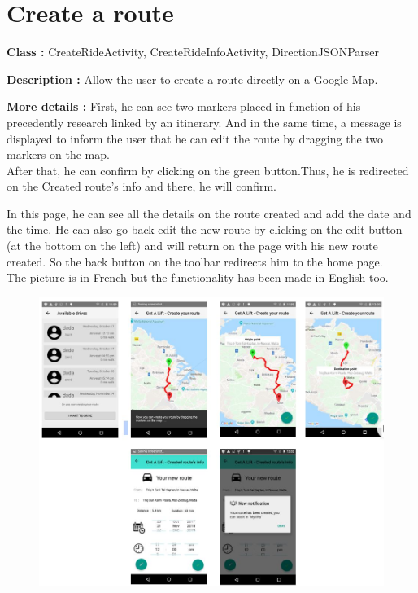 \section{Create a route}
\textbf{Class :} CreateRideActivity, CreateRideInfoActivity, DirectionJSONParser \newline

\textbf{Description :} Allow the user to create a route directly on a Google Map. \newline

\textbf{More details : }First, he can see two markers placed in function of his precedently research linked by an itinerary. And in the same time, a message is displayed to inform the user that he can edit the route by dragging the two markers on the map.\\ After that, he can confirm by clicking on the green button.Thus, he is redirected on the Created route’s info and there, he will confirm. \newline

In this page, he can see all the details on the route created and add the date and the time. He can also go back edit the new route by clicking on the edit button (at the bottom on the left) and will return on the page with his new route created.
So the back button on the toolbar redirects him to the home page. \\ 
The picture is in French but the functionality has been made in English too.

\begin{figure}[H]
\begin{center}
\includegraphics[scale = 0.9]{diagrams/Create_route.JPG} 
\end{center}
\end{figure}

